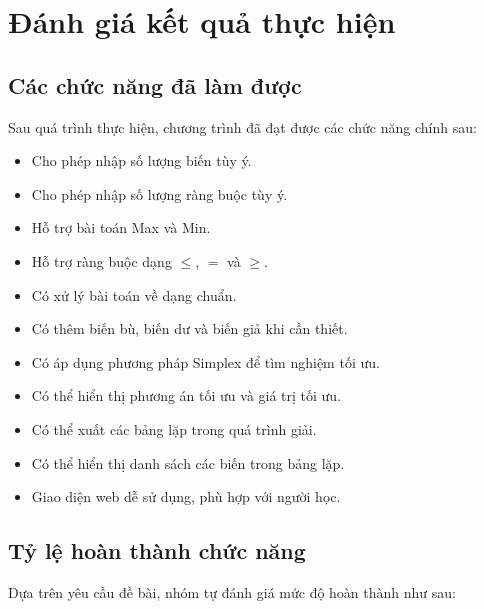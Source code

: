 \documentclass[14pt, a4paper]{extarticle}
\begin{document}
    \section{Đánh giá kết quả thực hiện}
    
    \subsection{Các chức năng đã làm được}
    
    Sau quá trình thực hiện, chương trình đã đạt được các chức năng chính sau:
    
    \begin{itemize}
        \item Cho phép nhập số lượng biến tùy ý.
        \item Cho phép nhập số lượng ràng buộc tùy ý.
        \item Hỗ trợ bài toán Max và Min.
        \item Hỗ trợ ràng buộc dạng $\leq$, $=$ và $\geq$.
        \item Có xử lý bài toán về dạng chuẩn.
        \item Có thêm biến bù, biến dư và biến giả khi cần thiết.
        \item Có áp dụng phương pháp Simplex để tìm nghiệm tối ưu.
        \item Có thể hiển thị phương án tối ưu và giá trị tối ưu.
        \item Có thể xuất các bảng lặp trong quá trình giải.
        \item Có thể hiển thị danh sách các biến trong bảng lặp.
        \item Giao diện web dễ sử dụng, phù hợp với người học.
    \end{itemize}
    
    
    \subsection{Tỷ lệ hoàn thành chức năng}
    
    Dựa trên yêu cầu đề bài, nhóm tự đánh giá mức độ hoàn thành như sau:
    
\end{document}
